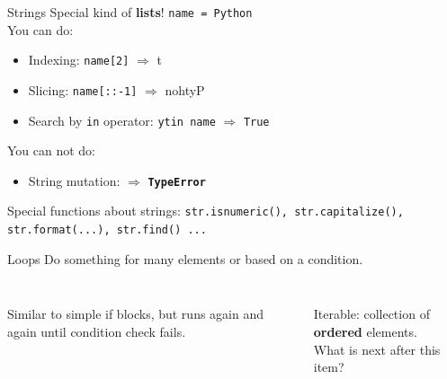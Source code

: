         \begin{frame}{Strings}
            \LARGE
            Special kind of \textbf{lists}! \texttt{name = \textquotesingle Python\textquotesingle\\}
            You can do:
            \begin{itemize}
                \item Indexing: \texttt{name[2]} $\Rightarrow$ \textquotesingle t\textquotesingle
                \item Slicing: \texttt{name[::-1]} $\Rightarrow$ \textquotesingle nohtyP\textquotesingle
                \item Search by \texttt{in} operator: \texttt{\textquotesingle yt\textquotesingle in name} $\Rightarrow$ \texttt{True}
            \end{itemize}
            You can not do:
            \begin{itemize}
                \item String mutation:  $\Rightarrow$ \textbf{\texttt{TypeError}}
            \end{itemize}
            Special functions about strings: \texttt{str.isnumeric(), str.capitalize(), str.format(...), str.find() ...}
        \end{frame}

        \begin{frame}{Loops}
            \LARGE Do something for many elements or based on a condition.
            \begin{columns}
                \begin{column}{0.5\textwidth}
                    \inputminted[frame=single,framesep=2pt]{python3}{../Lecture3/code-examples/while1.py}
                    Similar to simple if blocks, but runs again and again until condition check fails.
                \end{column}
                \begin{column}{0.5\textwidth}
                    \inputminted[frame=single,framesep=2pt]{python3}{../Lecture3/code-examples/for1.py}
                    Iterable: collection of \textbf{ordered} elements.\\
                    What is next after this item?\\
                \end{column}
            \end{columns}
        \end{frame}

